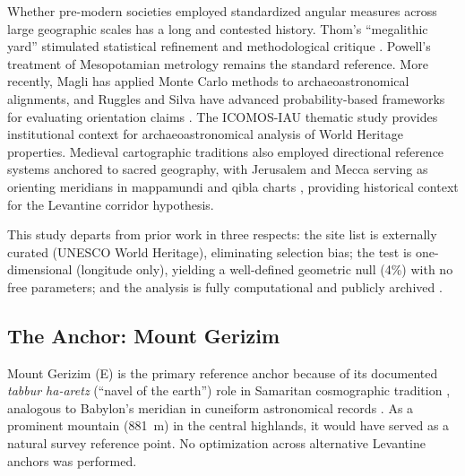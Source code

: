 \documentclass[HARVARD,twocolumn]{USG}
\begin{document}
Whether pre-modern societies employed standardized angular measures
across large geographic scales has a long and contested history.
Thom's ``megalithic yard'' \citep{thom1967,thom1971,thom1964}
stimulated statistical refinement \citep{kendall1974} and methodological
critique \citep{freeman1976}. Powell's treatment of Mesopotamian metrology
\citep{powell1987metrological} remains the standard reference. More recently,
Magli \citep{magli2013,magli2016} has applied Monte Carlo methods to
archaeoastronomical alignments, and Ruggles and Silva have advanced
probability-based frameworks for evaluating orientation claims
\citep{ruggles1999astronomy,ruggles2015handbook,silva2020statistical}.
The ICOMOS-IAU thematic study \citep{ruggles2010icomos} provides
institutional context for archaeoastronomical analysis of World Heritage
properties. Medieval cartographic traditions also employed directional
reference systems anchored to sacred geography, with Jerusalem and Mecca
serving as orienting meridians in mappamundi and qibla charts
\citep{harvey1987mappamundi}, providing historical context for the
Levantine corridor hypothesis.

This study departs from prior work in three respects: the site list
is externally curated (UNESCO World Heritage), eliminating selection
bias; the test is one-dimensional (longitude only), yielding a
well-defined geometric null (4\%) with no free parameters; and
the analysis is fully computational and publicly archived \citep{tenenbaum2026audit}.



\subsection{The Anchor: Mount Gerizim}
\label{sec:anchor}

Mount Gerizim (\GerizimLon\textdegree{}E) is the primary reference
anchor because of its documented \textit{tabbur ha-aretz} (``navel of the
earth'') role in Samaritan cosmographic tradition
\citep{purvis1968,macdonald1964,crown1989}, analogous to Babylon's meridian
in cuneiform astronomical records \citep{hunger2019mul}. As a prominent
mountain (881~m) in the central highlands, it would have served as a
natural survey reference point. No optimization
across alternative Levantine anchors was performed.
\end{document}
